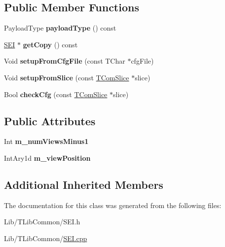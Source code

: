 \subsection*{Public Member Functions}
\begin{DoxyCompactItemize}
\item 
\mbox{\label{class_s_e_i_multiview_view_position_a8e59d2f53ab335ccbf90003e480eac36}} 
Payload\+Type {\bfseries payload\+Type} () const
\item 
\mbox{\label{class_s_e_i_multiview_view_position_affaa4be847449f5a694047dc93d83314}} 
\hyperlink{class_s_e_i}{S\+EI} $\ast$ {\bfseries get\+Copy} () const
\item 
\mbox{\label{class_s_e_i_multiview_view_position_ac0173c241147a8b5b81b112445b932b2}} 
Void {\bfseries setup\+From\+Cfg\+File} (const T\+Char $\ast$cfg\+File)
\item 
\mbox{\label{class_s_e_i_multiview_view_position_a33d7c94f10d513937c416b4e8d74ea90}} 
Void {\bfseries setup\+From\+Slice} (const \hyperlink{class_t_com_slice}{T\+Com\+Slice} $\ast$slice)
\item 
\mbox{\label{class_s_e_i_multiview_view_position_a5b112fdbc2deea833e58ae9d9a71fda5}} 
Bool {\bfseries check\+Cfg} (const \hyperlink{class_t_com_slice}{T\+Com\+Slice} $\ast$slice)
\end{DoxyCompactItemize}
\subsection*{Public Attributes}
\begin{DoxyCompactItemize}
\item 
\mbox{\label{class_s_e_i_multiview_view_position_a912eb87d50bfd456ef9c013b72019197}} 
Int {\bfseries m\+\_\+num\+Views\+Minus1}
\item 
\mbox{\label{class_s_e_i_multiview_view_position_ab03a3a0b4112738d6f871e6f2e0078cb}} 
Int\+Ary1d {\bfseries m\+\_\+view\+Position}
\end{DoxyCompactItemize}
\subsection*{Additional Inherited Members}


The documentation for this class was generated from the following files\+:\begin{DoxyCompactItemize}
\item 
Lib/\+T\+Lib\+Common/S\+E\+I.\+h\item 
Lib/\+T\+Lib\+Common/\hyperlink{_s_e_i_8cpp}{S\+E\+I.\+cpp}\end{DoxyCompactItemize}
